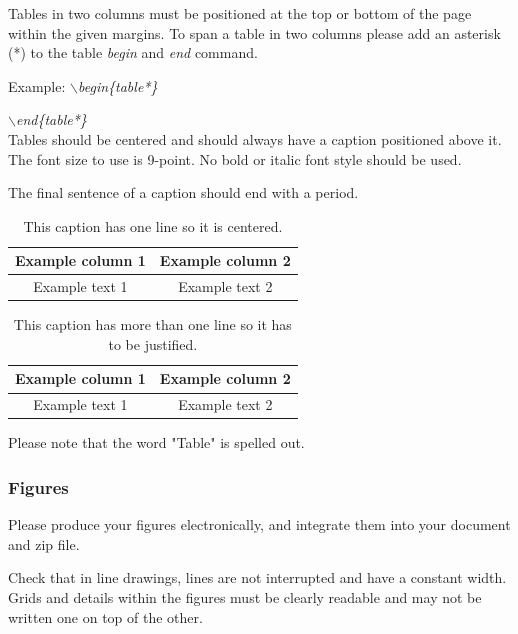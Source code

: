 \documentclass[a4paper,twoside]{article}
\begin{document}
Tables in two columns must be positioned at the top or bottom of the page within the given margins. To span a table in two columns please add an asterisk (*) to the table \textit{begin} and \textit{end} command.

Example: \textit{$\backslash$begin\{table*\}}

\hspace*{1.5cm}\textit{$\backslash$end\{table*\}}\\

Tables should be centered and should always have a caption positioned above it. The font size to use is 9-point. No bold or italic font style should be used.

The final sentence of a caption should end with a period.

\begin{table}[h]
\caption{This caption has one line so it is
centered.}\label{tab:example1} \centering
\begin{tabular}{|c|c|}
  \hline
  Example column 1 & Example column 2 \\
  \hline
  Example text 1 & Example text 2 \\
  \hline
\end{tabular}
\end{table}

\begin{table}[h]
\vspace{-0.2cm}
\caption{This caption has more than one line so it has to be
justified.}\label{tab:example2} \centering
\begin{tabular}{|c|c|}
  \hline
  Example column 1 & Example column 2 \\
  \hline
  Example text 1 & Example text 2 \\
  \hline
\end{tabular}
\end{table}

Please note that the word "Table" is spelled out.


\subsubsection{Figures}

Please produce your figures electronically, and integrate them into your document and zip file.

Check that in line drawings, lines are not interrupted and have a constant width. Grids and details within the figures must be clearly readable and may not be written one on top of the other.
\end{document}
